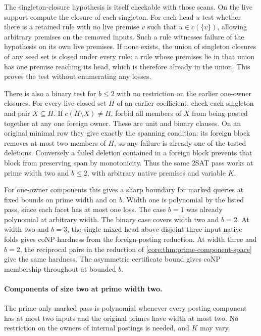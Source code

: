 The singleton-closure hypothesis is itself checkable
with those scans. On the live support compute the
closure of each singleton. For each head $u$ test
whether there is a retained rule with no live premise
$v$ such that $u\in c(\{v\})$, allowing arbitrary
premises on the removed inputs. Such a rule witnesses
failure of the hypothesis on its own live premises.
If none exists, the union of singleton closures of
any seed set is closed under every rule: a rule whose
premises lie in that union has one premise reaching
its head, which is therefore already in the union.
This proves the test without enumerating any losses.

There is also a binary test for $b\le2$ with no
restriction on the earlier one-owner closures.
For every live closed set $H$ of an earlier
coefficient, check each singleton and pair
$X\subseteq H$. If $c(H\setminus X)\ne H$,
forbid all members of $X$ from being posted
together at any one foreign owner. These are
unit and binary clauses. On an original
minimal row they give exactly the spanning
condition: its foreign block removes at most
two members of $H$, so any failure is already
one of the tested deletions. Conversely a
failed deletion contained in a foreign block
prevents that block from preserving span by
monotonicity. Thus the same 2SAT pass works at
prime width two and $b\le2$, with arbitrary
native premises and variable $K$.

For one-owner components this gives a sharp
boundary for marked queries at fixed bounds
on prime width and on $b$. Width one is
polynomial by the listed pass, since each facet
has at most one loss. The case $b=1$ was already
polynomial at arbitrary width. The binary case
covers width two and $b=2$. At width two and
$b=3$, the single mixed head above disjoint
three-input native folds gives coNP-hardness
from the foreign-posting reduction. At width
three and $b=2$, the reciprocal pairs in the
reduction of \cref{core:thm:prime-component-space}
give the same hardness. The asymmetric certificate
bound gives coNP membership throughout at
bounded $b$.

\paragraph{Components of size two at prime width two.}
The prime-only marked pass is polynomial whenever
every posting component has at most two inputs and
the original primes have width at most two. No
restriction on the owners of internal postings is
needed, and $K$ may vary.

